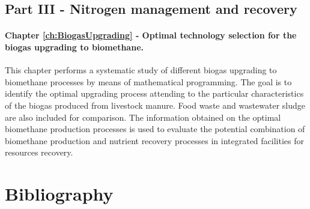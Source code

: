 \begin{refsection}[referencesCh1]
\subsection{Part III - Nitrogen management and recovery}
\paragraph{Chapter \ref{ch:BiogasUpgrading} - Optimal technology selection for the biogas upgrading to biomethane.} This chapter performs a systematic study of different biogas upgrading to biomethane processes by means of mathematical programming. The goal is to identify the optimal upgrading process attending to the particular characteristics of the biogas produced from livestock manure. Food waste and wastewater sludge are also included for comparison. 
The information obtained on the optimal biomethane production processes is used to evaluate the potential combination of biomethane production and nutrient recovery processes in integrated facilities for resources recovery.

\section*{Bibliography}
\printbibliography[heading=none]
\end{refsection}